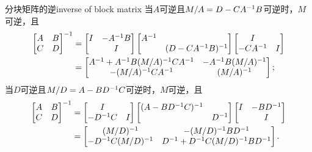 \begin{theorem}
	{分块矩阵的逆}{inverse of block matrix}
	当$A$可逆且$M/A=D-CA^{-1} B$可逆时，$M$可逆，且
	\begin{subequations}
		\begin{align}
			\begin{bmatrix}
				A&B\\C&D
			\end{bmatrix}^{-1}&=\begin{bmatrix}
				I&-A^{-1} B\\ &I
			\end{bmatrix}\begin{bmatrix}
				A^{-1}\\ &(D-CA^{-1} B)^{-1}
			\end{bmatrix}\begin{bmatrix}
				I\\-CA^{-1}&I
			\end{bmatrix}\\
			\label{eqn:[AB;CD]-1=M/A}
			&=\begin{bmatrix}
				A^{-1}+A^{-1} B(M/A)^{-1} CA^{-1}&-A^{-1} B(M/A)^{-1}\\
				-(M/A)^{-1} CA^{-1}&(M/A)^{-1}
			\end{bmatrix};
		\end{align}
	\end{subequations}
	当$D$可逆且$M/D=A-BD^{-1} C$可逆时，$M$可逆，且
	\begin{subequations}
		\begin{align}
			\begin{bmatrix}
				A&B\\C&D
			\end{bmatrix}^{-1}&=\begin{bmatrix}
				I\\-D^{-1} C&I
			\end{bmatrix}\begin{bmatrix}
				(A-BD^{-1} C)^{-1}\\ &D^{-1}
			\end{bmatrix}\begin{bmatrix}
				I&-BD^{-1}\\ &I
			\end{bmatrix}\\
			\label{eqn:[AB;CD]-1=M/D}
			&=\begin{bmatrix}
				(M/D)^{-1}&-(M/D)^{-1} BD^{-1}\\
				-D^{-1} C(M/D)^{-1}&D^{-1}+D^{-1} C(M/D)^{-1} BD^{-1}
			\end{bmatrix}.
		\end{align}
	\end{subequations}

\end{theorem}
